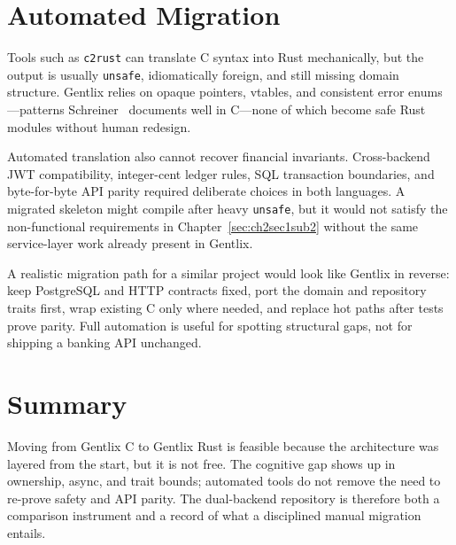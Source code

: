 \section{Automated Migration}
\label{sec:ch7sec2}

\par Tools such as \texttt{c2rust} can translate C syntax into Rust mechanically, but 
the output is usually \texttt{unsafe}, idiomatically foreign, and still missing domain 
structure. Gentlix relies on opaque pointers, vtables, and consistent error enums---patterns 
Schreiner~\cite{Schreiner1993} documents well in C---none of which become safe Rust 
modules without human redesign.

\par Automated translation also cannot recover financial invariants. Cross-backend JWT 
compatibility, integer-cent ledger rules, SQL transaction boundaries, and byte-for-byte 
API parity required deliberate choices in both languages. A migrated skeleton might compile 
after heavy \texttt{unsafe}, but it would not satisfy the non-functional requirements in 
Chapter~\ref{sec:ch2sec1sub2} without the same service-layer work already present in 
Gentlix.

\par A realistic migration path for a similar project would look like Gentlix in reverse: 
keep PostgreSQL and HTTP contracts fixed, port the domain and repository traits first, 
wrap existing C only where needed, and replace hot paths after tests prove parity. Full 
automation is useful for spotting structural gaps, not for shipping a banking API unchanged.

\section*{Summary}

\par Moving from Gentlix C to Gentlix Rust is feasible because the architecture was 
layered from the start, but it is not free. The cognitive gap shows up in ownership, 
async, and trait bounds; automated tools do not remove the need to re-prove safety and 
API parity. The dual-backend repository is therefore both a comparison instrument and 
a record of what a disciplined manual migration entails.

